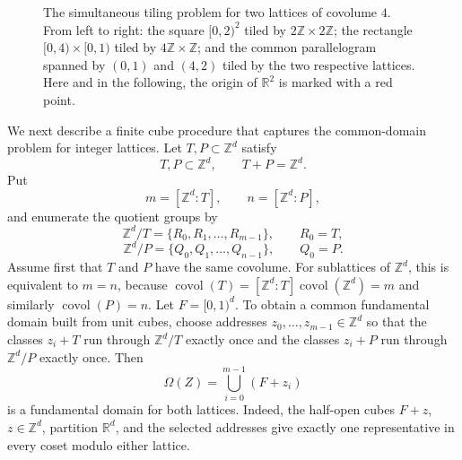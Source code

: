 \documentclass[11pt,reqno]{amsart}
\newcommand{\PickTileColor}[1]{%
  \pgfmathtruncatemacro{\TileColorIndex}{mod((#1)+2000,20)}%
  \def\fillcol{TileOrange}%
  \ifcase\TileColorIndex
    \def\fillcol{TileOrange}\or
    \def\fillcol{TileGreen}\or
    \def\fillcol{TileTan}\or
    \def\fillcol{TileLightBlue}\or
    \def\fillcol{TilePink}\or
    \def\fillcol{TileGold}\or
    \def\fillcol{TileTeal}\or
    \def\fillcol{TileRose}\or
    \def\fillcol{TilePaleGreen}\or
    \def\fillcol{TileCyan}\or
    \def\fillcol{TileMauve}\or
    \def\fillcol{TileYellow}\or
    \def\fillcol{TileBlue}\or
    \def\fillcol{TilePurple}\or
    \def\fillcol{TileTurquoise}\or
    \def\fillcol{TileBrightYellow}\or
    \def\fillcol{TileBrown}\or
    \def\fillcol{TileFreshGreen}\or
    \def\fillcol{TileSteel}\or
    \def\fillcol{TilePaleRose}%
  \fi
}
\newcommand{\MarkOrigin}{\node[origin marker] at (0,0) {};}
\numberwithin{equation}{section}
\theoremstyle{definition}
\theoremstyle{remark}
\newcommand{\R}{\mathbb R}
\newcommand{\Z}{\mathbb Z}
\newcommand{\covol}{\operatorname{covol}}
\begin{document}
\begin{figure}[htbp]
\begin{minipage}[b]{\dimexpr(\textwidth-1.5cm)/4\relax}
\end{minipage}
\caption{The simultaneous tiling problem for two lattices of covolume $4$.  From left to right: the square $[0,2)^2$ tiled by $2\Z\times2\Z$; the rectangle $[0,4)\times[0,1)$ tiled by $4\Z\times\Z$; and the common parallelogram spanned by $(0,1)$ and $(4,2)$ tiled by the two respective lattices.  Here and in the following, the origin of $\mathbb R^2$ is marked with a red point.}
\label{fig:simultaneous-tiling-four-panels}
\end{figure}

We next describe a finite cube procedure that captures the common-domain
problem for integer lattices.  Let $T,P\subset\Z^d$ satisfy
\begin{equation}\label{eq:commensurable-normalization}
 T,P\subset\Z^d,
 \qquad
 T+P=\Z^d.
\end{equation}
Put
\[
 m=[\Z^d:T],
 \qquad
 n=[\Z^d:P],
\]
and enumerate the quotient groups by
\begin{equation}\label{eq:quotient-enumeration}
 \Z^d/T=\{R_0,R_1,\ldots,R_{m-1}\},
 \qquad R_0=T,
\end{equation}
\begin{equation}\label{eq:column-enumeration}
 \Z^d/P=\{Q_0,Q_1,\ldots,Q_{n-1}\},
 \qquad Q_0=P.
\end{equation}
Assume first that $T$ and $P$ have the same covolume.  For sublattices of
$\Z^d$, this is equivalent to $m=n$, because
$\covol(T)=[\Z^d:T]\covol(\Z^d)=m$ and similarly $\covol(P)=n$.  Let $F=[0,1)^d$.  To obtain a common fundamental domain
built from unit cubes, choose addresses $z_0,\ldots,z_{m-1}\in\Z^d$ so that
the classes $z_i+T$ run through $\Z^d/T$ exactly once and the classes
$z_i+P$ run through $\Z^d/P$ exactly once.  Then
\begin{equation}\label{eq:section3-hard-domain}
 \Omega(Z)=\bigcup_{i=0}^{m-1}(F+z_i)
\end{equation}
is a fundamental domain for both lattices.  Indeed, the half-open cubes
$F+z$, $z\in\Z^d$, partition $\R^d$, and the selected addresses give exactly
one representative in every coset modulo either lattice.
\end{document}
